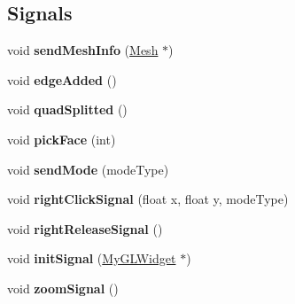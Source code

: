 \subsection*{Signals}
\begin{DoxyCompactItemize}
\item 
\hypertarget{class_my_g_l_widget_a32d9c312483678082e729f524df898bd}{void {\bfseries send\-Mesh\-Info} (\hyperlink{class_mesh}{Mesh} $\ast$)}\label{class_my_g_l_widget_a32d9c312483678082e729f524df898bd}

\item 
\hypertarget{class_my_g_l_widget_a83411f91728275d821b760d81a88e962}{void {\bfseries edge\-Added} ()}\label{class_my_g_l_widget_a83411f91728275d821b760d81a88e962}

\item 
\hypertarget{class_my_g_l_widget_a4e72035a811eb818464a6de043dee636}{void {\bfseries quad\-Splitted} ()}\label{class_my_g_l_widget_a4e72035a811eb818464a6de043dee636}

\item 
\hypertarget{class_my_g_l_widget_af8e69b00cdb42e9d4f18070c515380a4}{void {\bfseries pick\-Face} (int)}\label{class_my_g_l_widget_af8e69b00cdb42e9d4f18070c515380a4}

\item 
\hypertarget{class_my_g_l_widget_a8ce56d64a3a9bf014e78a4e800251e87}{void {\bfseries send\-Mode} (mode\-Type)}\label{class_my_g_l_widget_a8ce56d64a3a9bf014e78a4e800251e87}

\item 
\hypertarget{class_my_g_l_widget_a716be2b987409644460a7dc8fde54f1b}{void {\bfseries right\-Click\-Signal} (float x, float y, mode\-Type)}\label{class_my_g_l_widget_a716be2b987409644460a7dc8fde54f1b}

\item 
\hypertarget{class_my_g_l_widget_ac2f1e823615b34851993a4c6b13d4b51}{void {\bfseries right\-Release\-Signal} ()}\label{class_my_g_l_widget_ac2f1e823615b34851993a4c6b13d4b51}

\item 
\hypertarget{class_my_g_l_widget_a4fd36dbed5a92553a85d5fc0570962c6}{void {\bfseries init\-Signal} (\hyperlink{class_my_g_l_widget}{My\-G\-L\-Widget} $\ast$)}\label{class_my_g_l_widget_a4fd36dbed5a92553a85d5fc0570962c6}

\item 
\hypertarget{class_my_g_l_widget_a5a2bd6ad94d3b56df55d0a98e8dec949}{void {\bfseries zoom\-Signal} ()}\label{class_my_g_l_widget_a5a2bd6ad94d3b56df55d0a98e8dec949}


\end{DoxyCompactItemize}
